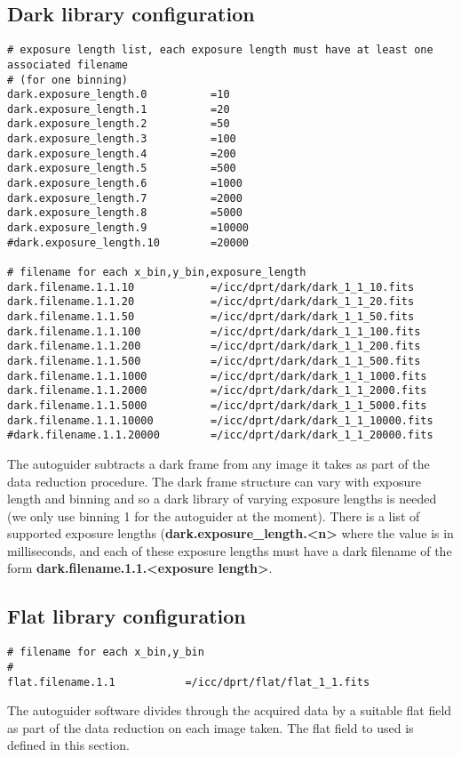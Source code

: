 \documentclass[10pt,a4paper]{article}
\begin{document}
\subsection{Dark library configuration}

\begin{verbatim}
# exposure length list, each exposure length must have at least one associated filename 
# (for one binning)
dark.exposure_length.0			=10
dark.exposure_length.1			=20
dark.exposure_length.2			=50
dark.exposure_length.3			=100
dark.exposure_length.4			=200
dark.exposure_length.5			=500
dark.exposure_length.6			=1000
dark.exposure_length.7			=2000
dark.exposure_length.8			=5000
dark.exposure_length.9			=10000
#dark.exposure_length.10		=20000

# filename for each x_bin,y_bin,exposure_length
dark.filename.1.1.10			=/icc/dprt/dark/dark_1_1_10.fits
dark.filename.1.1.20			=/icc/dprt/dark/dark_1_1_20.fits
dark.filename.1.1.50			=/icc/dprt/dark/dark_1_1_50.fits
dark.filename.1.1.100			=/icc/dprt/dark/dark_1_1_100.fits
dark.filename.1.1.200			=/icc/dprt/dark/dark_1_1_200.fits
dark.filename.1.1.500			=/icc/dprt/dark/dark_1_1_500.fits
dark.filename.1.1.1000			=/icc/dprt/dark/dark_1_1_1000.fits
dark.filename.1.1.2000			=/icc/dprt/dark/dark_1_1_2000.fits
dark.filename.1.1.5000			=/icc/dprt/dark/dark_1_1_5000.fits
dark.filename.1.1.10000			=/icc/dprt/dark/dark_1_1_10000.fits
#dark.filename.1.1.20000		=/icc/dprt/dark/dark_1_1_20000.fits
\end{verbatim}

The autoguider subtracts a dark frame from any image it takes as part of the data reduction procedure. The dark frame structure can vary with exposure length and binning and so a dark library of varying exposure lengths is needed (we only use binning 1 for the autoguider at the moment). There is a list of supported exposure lengths ({\bf dark.exposure\_length.\textless n\textgreater } where the value is in milliseconds, and each of these exposure lengths must have a dark filename of the form {\bf dark.filename.1.1.\textless exposure length\textgreater }.

\subsection{Flat library configuration}

\begin{verbatim}
# filename for each x_bin,y_bin
#
flat.filename.1.1			=/icc/dprt/flat/flat_1_1.fits
\end{verbatim}

The autoguider software divides through the acquired data by a suitable flat field as part of the data reduction on each image taken. The flat field to used is defined in this section.

\begin{thebibliography}{99}


\end{thebibliography}
\end{document}
